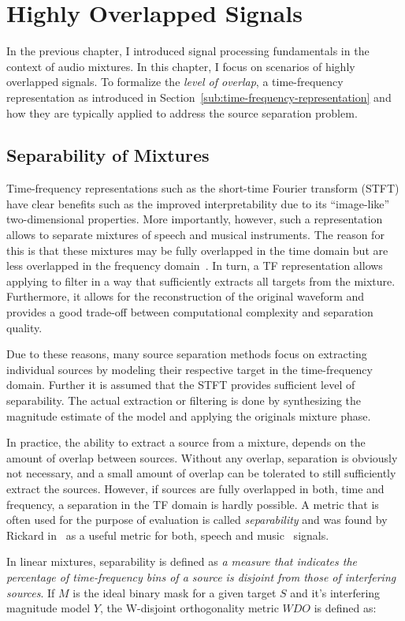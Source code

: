 \hypertarget{highly-overlapped-signals}{%
\chapter{Highly Overlapped Signals}\label{cha:highly-overlapped-signals}}

In the previous chapter, I introduced signal processing fundamentals in the context of audio mixtures.
In this chapter, I focus on scenarios of highly overlapped signals.
To formalize the \emph{level of overlap}, a time-frequency representation as introduced in Section~\ref{sub:time-frequency-representation} and how they are typically applied to address the source separation problem.

\hypertarget{separability-of-mixtures}{%
\section{Separability of Mixtures}\label{separability-of-mixtures}}

Time-frequency representations such as the short-time Fourier transform (STFT) have clear benefits such as the improved interpretability due to its ``image-like'' two-dimensional properties.
More importantly, however, such a representation allows to separate mixtures of speech and musical instruments.
The reason for this is that these mixtures may be fully overlapped in the time domain but are less overlapped in the frequency domain~\cite{rickard02, giannoulis11, rafii}.
In turn, a TF representation allows applying to filter in a way that sufficiently extracts all targets from the mixture.
Furthermore, it allows for the reconstruction of the original waveform and provides a good trade-off between computational complexity and separation quality.
\par
Due to these reasons, many source separation methods focus on extracting individual sources by modeling their respective target in the time-frequency domain.
Further it is assumed that the STFT provides sufficient level of separability.
The actual extraction or filtering is done by synthesizing the magnitude estimate of the model and applying the originals mixture phase.
\par
In practice, the ability to extract a source from a mixture, depends on the amount of overlap between sources.
Without any overlap, separation is obviously not necessary, and a small amount of overlap can be tolerated to still sufficiently extract the sources.
However, if sources are fully overlapped in both, time and frequency, a separation in the TF domain is hardly possible.
A metric that is often used for the purpose of evaluation is called \emph{separability} and was found by Rickard in~\cite{rickard02} as a useful metric for both, speech and music~\cite{giannoulis11} signals.
\par
In linear mixtures, separability is defined as \emph{a measure that indicates the percentage of time-frequency bins of a source is disjoint from those of interfering sources}.
If \(M\) is the ideal binary mask for a given target \(S\) and it's interfering
magnitude model \(Y\), the W-disjoint orthogonality metric \(WDO\) is defined as:

